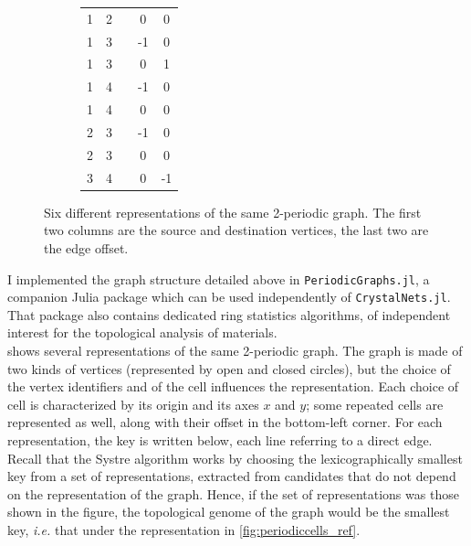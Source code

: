 \documentclass[main.tex]{subfiles}
\begin{document}
\begin{figure}[t]
\begin{subfigure}[b]{0.35\linewidth}
		\centering\scriptsize\begin{tabular}{ccccc}
			1&2&&0&0\\
			1&3&&-1&0\\
			1&3&&0&1\\
			1&4&&-1&0\\
			1&4&&0&0\\
			2&3&&-1&0\\
			2&3&&0&0\\
			3&4&&0&-1
		\end{tabular}
		\vspace{-0.5em}
	\end{subfigure}
	\vspace{2mm}
	\caption{Six different representations of the same 2-periodic graph. The first two columns are the source and destination vertices, the last two are the edge offset.} \label{periodiccells}
\end{figure}

I implemented the graph structure detailed above in \texttt{PeriodicGraphs.jl}, a companion Julia package which can be used independently of \texttt{CrystalNets.jl}. That package also contains dedicated ring statistics algorithms, of independent interest for the topological analysis of materials.\\

 shows several representations of the same 2-periodic graph. The graph is made of two kinds of vertices (represented by open and closed circles), but the choice of the vertex identifiers and of the cell influences the representation. Each choice of cell is characterized by its origin and its axes $x$ and $y$; some repeated cells are represented as well, along with their offset in the bottom-left corner. For each representation, the key is written below, each line referring to a direct edge. Recall that the Systre algorithm works by choosing the lexicographically smallest key from a set of representations, extracted from candidates that do not depend on the representation of the graph. Hence, if the set of representations was those shown in the figure, the topological genome of the graph would be the smallest key, \textit{i.e.} that under the representation in \cref{fig:periodiccells_ref}.

\end{document}
